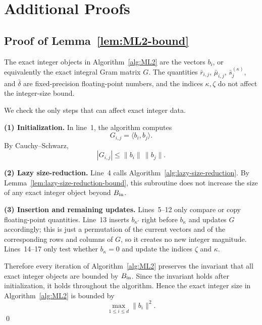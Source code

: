 \section{Additional Proofs}
\label{sec:proofs}

\subsection{Proof of Lemma~\ref{lem:ML2-bound}}
\label{subsec:ML2-bound}

The exact integer objects in Algorithm~\ref{alg:ML2} are the vectors $b_i$, or
equivalently the exact integral Gram matrix $G$. The quantities
$\bar r_{i,j}$, $\bar\mu_{i,j}$, $\bar s^{(\kappa)}_j$, and $\bar\delta$ are
fixed-precision floating-point numbers, and the indices $\kappa,\zeta$ do not
affect the integer-size bound.

We check the only steps that can affect exact integer data.

\smallskip
\noindent\textbf{(1) Initialization.}
In line~1, the algorithm computes
\[
  G_{i,j}=\langle b_i,b_j\rangle .
\]
By Cauchy--Schwarz,
\[
  |G_{i,j}|
  \le \|b_i\|\,\|b_j\|.
\]

\smallskip
\noindent\textbf{(2) Lazy size-reduction.}
Line~4 calls Algorithm~\ref{alg:lazy-size-reduction}. By
Lemma~\ref{lem:lazy-size-reduction-bound}, this subroutine does not increase
the size of any exact integer object beyond $B_{\rm in}$.

\smallskip
\noindent\textbf{(3) Insertion and remaining updates.}
Lines~5--12 only compare or copy floating-point quantities. Line~13 inserts
$b_{\kappa'}$ right before $b_\kappa$ and updates $G$ accordingly; this is just
a permutation of the current vectors and of the corresponding rows and columns
of $G$, so it creates no new integer magnitude. Lines~14--17 only test whether
$b_\kappa=0$ and update the indices $\zeta$ and $\kappa$.

Therefore every iteration of Algorithm~\ref{alg:ML2} preserves the invariant
that all exact integer objects are bounded by $B_{\rm in}$. Since the invariant
holds after initialization, it holds throughout the algorithm. Hence the exact
integer size in Algorithm~\ref{alg:ML2} is bounded by
\[
  \max_{1\le i\le d}\|b_i\|^2.
\] \qed

